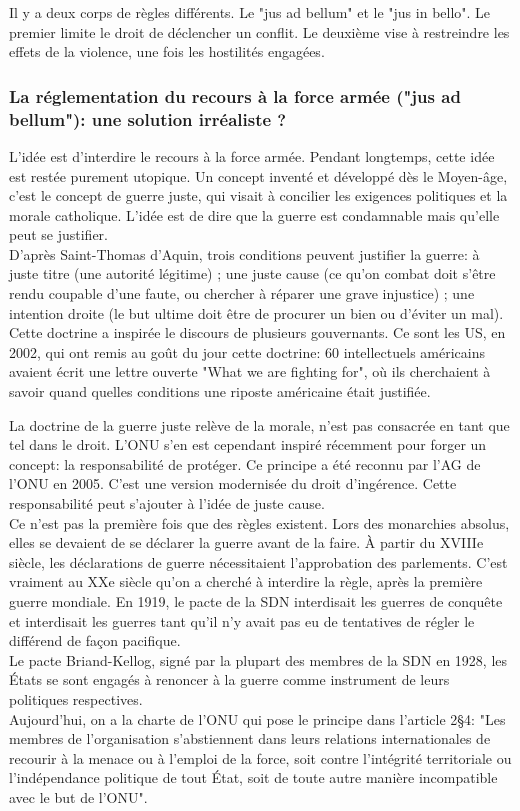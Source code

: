 \documentclass[10pt, a4paper, openany]{book}
\begin{document}
Il y a deux  corps de règles différents. Le "jus ad bellum" et le "jus in bello". Le premier limite le droit de déclencher un conflit. Le deuxième vise à restreindre les effets de la violence, une fois les hostilités engagées. 

\subsubsection{La réglementation du recours à la force armée ("jus ad bellum"): une solution irréaliste ?}

L'idée est d'interdire le recours à la force armée. Pendant longtemps, cette idée est restée purement utopique. Un concept inventé et développé dès le Moyen-âge, c'est le concept de guerre juste, qui visait à concilier les exigences politiques et la morale catholique. L'idée est de dire que la guerre est condamnable mais qu'elle peut se justifier. \\
D'après Saint-Thomas d'Aquin, trois conditions peuvent justifier la guerre: à juste titre (une autorité légitime) ; une juste cause (ce qu'on combat doit s'être rendu coupable d'une faute, ou chercher à réparer une grave injustice) ; une intention droite (le but ultime doit être de procurer un bien ou d'éviter un mal). \\
Cette doctrine a inspirée le discours de plusieurs gouvernants. Ce sont les US, en 2002, qui ont remis au goût du jour cette doctrine: 60 intellectuels américains avaient écrit une lettre ouverte "What we are fighting for", où ils cherchaient à savoir quand quelles conditions une riposte américaine était justifiée.


La doctrine de la guerre juste relève de la morale, n'est pas consacrée en tant que tel dans le droit. L'ONU s'en est cependant inspiré récemment pour forger un concept: la responsabilité de protéger. Ce principe a été reconnu par l'AG de l'ONU en 2005. C'est une version modernisée du droit d'ingérence. Cette responsabilité peut s'ajouter à l'idée de juste cause. \\
Ce n'est pas la première fois que des règles existent. Lors des monarchies absolus, elles se devaient de se déclarer la guerre avant de la faire. À partir du XVIIIe siècle, les déclarations de guerre nécessitaient l'approbation des parlements. C'est vraiment au XXe siècle qu'on a cherché à interdire la règle, après la première guerre mondiale. En 1919, le pacte de la SDN interdisait les guerres de conquête et interdisait les guerres tant qu'il n'y avait pas eu de tentatives de régler le différend de façon pacifique. \\
Le pacte Briand-Kellog, signé par la plupart des membres de la SDN en 1928, les États se sont engagés à renoncer à la guerre comme instrument de leurs politiques respectives. \\
Aujourd'hui, on a la charte de l'ONU qui pose le principe dans l'article 2§4: "Les membres de l'organisation s'abstiennent dans leurs relations internationales de recourir à la menace ou à l'emploi de la force, soit contre l'intégrité territoriale ou l'indépendance politique de tout État, soit de toute autre manière incompatible avec le but de l'ONU". 
\end{document}
